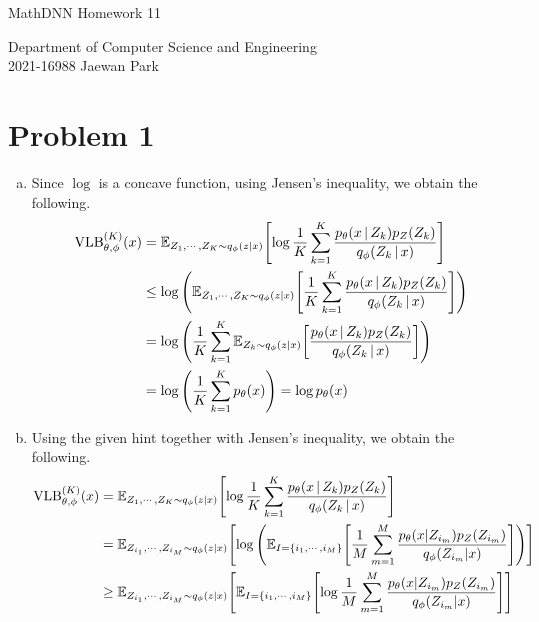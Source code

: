 \documentclass[10pt]{article}
\begin{document}
\begin{center}
    {\LARGE MathDNN Homework 11} \\
\end{center}
\begin{flushright}
    Department of Computer Science and Engineering \\
    2021-16988 Jaewan Park
\end{flushright}

\section*{Problem 1}
\begin{enumerate}[(a)]
    \item Since $\log$ is a concave function, using Jensen's inequality, we obtain the following.
    \begin{align*}
        \mathrm{VLB}_{\theta, \phi}^{(K)}(x) &= \mathbb{E}_{Z_1, \cdots, Z_K \sim q_{\phi}(z|x)}\qty[\log\frac{1}{K}\sum_{k=1}^{K}\frac{p_{\theta}\qty(x \,|\, Z_k)p_Z\qty(Z_k)}{q_{\phi}\qty(Z_k \,|\, x)}] \\
        &\leq \log\qty(\mathbb{E}_{Z_1, \cdots, Z_K \sim q_{\phi}(z|x)}\qty[\frac{1}{K}\sum_{k=1}^{K}\frac{p_{\theta}\qty(x \,|\, Z_k)p_Z\qty(Z_k)}{q_{\phi}\qty(Z_k \,|\, x)}]) \\
        &= \log\qty(\frac{1}{K}\sum_{k=1}^{K}\mathbb{E}_{Z_k \sim q_{\phi}(z|x)}\qty[\frac{p_{\theta}\qty(x \,|\, Z_k)p_Z\qty(Z_k)}{q_{\phi}\qty(Z_k \,|\, x)}]) \\
        &= \log\qty(\frac{1}{K}\sum_{k=1}^{K}p_\theta(x)) = \log p_\theta(x)
    \end{align*}
    \item Using the given hint together with Jensen's inequality, we obtain the following.
    \begin{align*}
        \mathrm{VLB}_{\theta, \phi}^{(K)}(x) &= \mathbb{E}_{Z_{1}, \cdots, Z_{K} \sim q_{\phi}(z|x)}\qty[\log\frac{1}{K}\sum_{k=1}^{K}\frac{p_{\theta}\qty(x \,|\, Z_{k})p_Z\qty(Z_{k})}{q_{\phi}\qty(Z_{k} \,|\, x)}] \\
        &= \mathbb{E}_{Z_{i_1}, \cdots, Z_{i_M} \sim q_\phi(z|x)}\qty[\log\qty(\mathbb{E}_{I = \qty{i_1, \cdots, i_M}}\qty[\frac{1}{M}\sum_{m=1}^{M}\frac{p_\theta\qty(x|Z_{i_m})p_Z\qty(Z_{i_m})}{q_\phi\qty(Z_{i_m}|x)}])] \\
        &\geq \mathbb{E}_{Z_{i_1}, \cdots, Z_{i_M} \sim q_\phi(z|x)}\qty[\mathbb{E}_{I = \qty{i_1, \cdots, i_M}}\qty[\log\frac{1}{M}\sum_{m=1}^{M}\frac{p_\theta\qty(x|Z_{i_m})p_Z\qty(Z_{i_m})}{q_\phi\qty(Z_{i_m}|x)}]] \\

\end{align*}
\end{enumerate}
\end{document}
